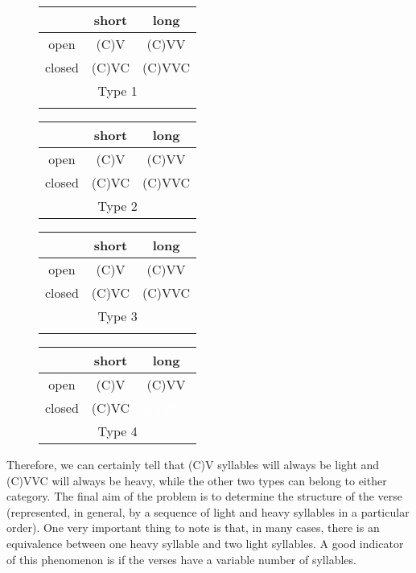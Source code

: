 \begin{refsection}
\begin{figure}
\begin{multicols}{2}
    \begin{tabular}{|c|c|c|}
        \hline 
         & short & long \\ \hline
         open &(C)V& \cellcolor{lightgray}(C)VV\\ \hline
         closed &(C)VC& \cellcolor{lightgray}(C)VVC\\ \hline
         \multicolumn{3}{c}{Type 1}\\ 
         \multicolumn{3}{c}{} \\ 
    \end{tabular}
    \begin{tabular}{|c|c|c|}
        \hline 
         & short & long \\ \hline
         open &(C)V&(C)VV\\ \hline
         closed & \cellcolor{lightgray}(C)VC& \cellcolor{lightgray}(C)VVC\\ \hline
         \multicolumn{3}{c}{Type 2}\\ 
    \end{tabular}
   \begin{tabular}{|c|c|c|}
        \hline 
         & short & long \\ \hline
         open &(C)V& \cellcolor{lightgray}(C)VV\\ \hline
         closed & \cellcolor{lightgray}(C)VC& \cellcolor{lightgray}(C)VVC\\ \hline
         \multicolumn{3}{c}{Type 3}\\ 
         \multicolumn{3}{c}{} \\ 
    \end{tabular}
    \begin{tabular}{|c|c|c|}
        \hline 
         & short & long \\ \hline
         open &(C)V& \cellcolor{lightgray}(C)VV\\ \hline
         closed & \cellcolor{lightgray}(C)VC& \cellcolor{black} \textcolor{white}{(C)VVC} \\ \hline
         \multicolumn{3}{c}{Type 4}\\
    \end{tabular}
\end{multicols}
\end{figure}

Therefore, we can certainly tell that (C)V syllables will always be light and (C)VVC will always be heavy, while the other two types can belong to either category. The final aim of the problem is to determine the structure of the verse (represented, in general, by a sequence of light and heavy syllables in a particular order). One very important thing to note is that, in many cases, there is an equivalence between one heavy syllable and two light syllables. A good indicator of this phenomenon is if the verses have a variable number of syllables.


\end{refsection}
